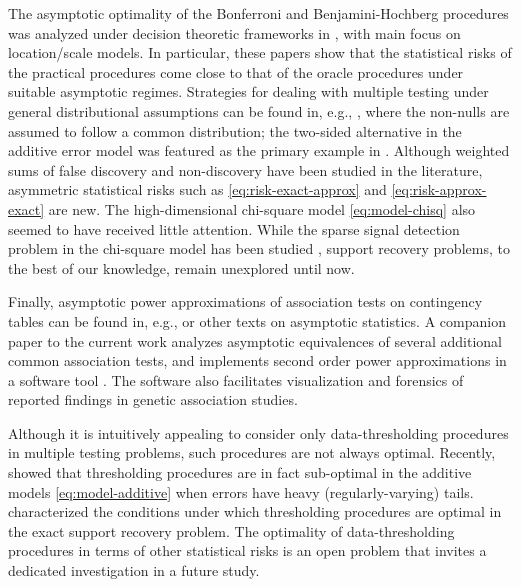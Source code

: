 The asymptotic optimality of the Bonferroni and Benjamini-Hochberg procedures 
was analyzed under decision theoretic frameworks in \cite{genovese2002operating, bogdan2011asymptotic, neuvial2012false}, with main focus on location/scale models. 
In particular, these papers show that the statistical risks of the practical procedures come close to that of the oracle procedures under suitable asymptotic regimes.
Strategies for dealing with multiple testing under general distributional assumptions can be found in, e.g., \cite{efron2004large, storey2007optimal, sun2007oracle}, where the non-nulls are assumed to follow a common distribution; the two-sided alternative in the additive error model was featured as the primary example in \cite{sun2007oracle}.
Although weighted sums of false discovery and non-discovery have been studied in the literature, asymmetric statistical risks such as \eqref{eq:risk-exact-approx} and \eqref{eq:risk-approx-exact} are new.
The high-dimensional chi-square model \eqref{eq:model-chisq} also seemed to have received little attention.
While the sparse signal detection problem in the chi-square model has been studied \cite{donoho2004higher}, support recovery problems, to the best of our knowledge, remain unexplored until now.

Finally, asymptotic power approximations of association tests on contingency tables can be found in, e.g., \citet{ferguson2017course} or other texts on asymptotic statistics.
A companion paper to the current work analyzes asymptotic equivalences of several additional common association tests, and implements second order power approximations in a software tool \cite{gao2019upass}. 
The software also facilitates visualization and forensics of reported findings in genetic association studies.

\medskip

Although it is intuitively appealing to consider only data-thresholding procedures in multiple testing problems, such procedures are not always optimal.
Recently, \citet{chen2018scan} showed that thresholding procedures are in fact sub-optimal in the additive models \eqref{eq:model-additive} when errors have heavy (regularly-varying) tails. 
\citet{gao2018fundamental} characterized the conditions under which thresholding procedures are optimal in the exact support recovery problem.
The optimality of data-thresholding procedures in terms of other statistical risks is an open problem that invites a dedicated investigation in a future study. 

